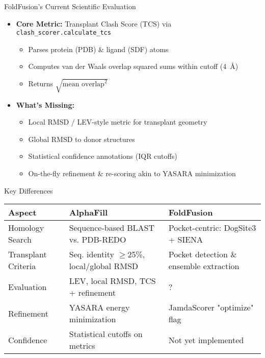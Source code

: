 \documentclass[aspectratio=169]{beamer}
\begin{document}
\begin{frame}{FoldFusion's Current Scientific Evaluation}
    \begin{itemize}
        \item \textbf{Core Metric:} Transplant Clash Score (TCS) via \texttt{clash\_scorer.calculate\_tcs}
              \begin{itemize}
                  \item Parses protein (PDB) \& ligand (SDF) atoms
                  \item Computes van der Waals overlap squared sums within cutoff (4~\AA)
                  \item Returns $\sqrt{\text{mean overlap}^2}$
              \end{itemize}
        \item \textbf{What's Missing:}
              \begin{itemize}
                  \item Local RMSD / LEV-style metric for transplant geometry
                  \item Global RMSD to donor structures
                  \item Statistical confidence annotations (IQR cutoffs)
                  \item On-the-fly refinement \& re-scoring akin to YASARA minimization
              \end{itemize}
    \end{itemize}
\end{frame}

\begin{frame}{Key Differences}
    \begin{tabular}{|p{2.5cm}|p{5cm}|p{5cm}|}
        \hline
        \textbf{Aspect}     & \textbf{AlphaFill}                          & \textbf{FoldFusion}                     \\
        \hline
        Homology Search     & Sequence-based BLAST vs. PDB-REDO           & Pocket-centric: DogSite3 + SIENA        \\
        \hline
        Transplant Criteria & Seq. identity $\geq$25\%, local/global RMSD & Pocket detection \& ensemble extraction \\
        \hline
        Evaluation          & LEV, local RMSD, TCS + refinement           & ?                                       \\
        \hline
        Refinement          & YASARA energy minimization                  & JamdaScorer "optimize" flag             \\
        \hline
        Confidence          & Statistical cutoffs on metrics              & Not yet implemented                     \\
        \hline
    \end{tabular}
\end{frame}
\end{document}
